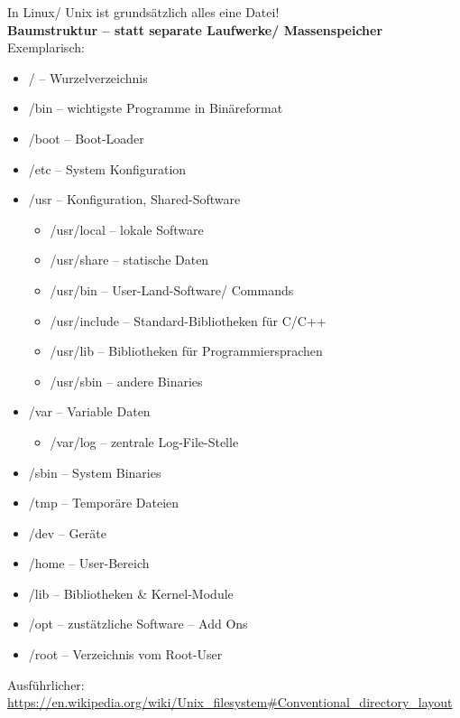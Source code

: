 \documentclass[xcolor=dvipsnames,aspectratio=169]{beamer}
\begin{document}
\begin{frame}
In Linux/ Unix ist grundsätzlich alles eine Datei!\\
\textbf{Baumstruktur -- statt separate Laufwerke/ Massenspeicher}
Exemplarisch:
\begin{itemize}
	\item / -- Wurzelverzeichnis
	\item /bin -- wichtigste Programme in Binäreformat
	\item /boot -- Boot-Loader
	\item /etc -- System Konfiguration

	\item /usr -- Konfiguration, Shared-Software
	\begin{itemize}
		\item /usr/local -- lokale Software
		\item /usr/share -- statische Daten
		\item /usr/bin -- User-Land-Software/ Commands
		\item /usr/include -- Standard-Bibliotheken für C/C++
		\item /usr/lib -- Bibliotheken für Programmiersprachen
		\item /usr/sbin -- andere Binaries
	\end{itemize}

\end{itemize}
\end{frame}
\begin{frame}
\begin{itemize}
\item /var -- Variable Daten
	\begin{itemize}
		\item /var/log -- zentrale Log-File-Stelle
	\end{itemize}
	\item /sbin -- System Binaries
	\item /tmp -- Temporäre Dateien
	\item /dev -- Geräte
	\item /home -- User-Bereich
	\item /lib -- Bibliotheken \& Kernel-Module
	\item /opt -- zustätzliche Software -- Add Ons
	\item /root -- Verzeichnis vom Root-User
\end{itemize}
Ausführlicher: \url{https://en.wikipedia.org/wiki/Unix_filesystem\#Conventional_directory_layout}
\end{frame}
\end{document}
